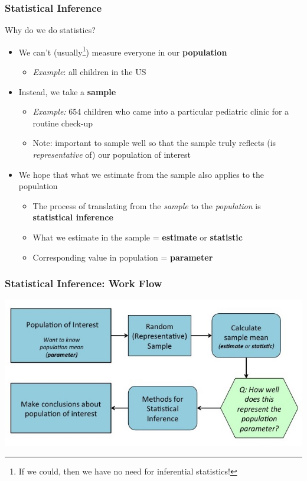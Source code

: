 \documentclass[12pt, 
hyperref={colorlinks=true, linkcolor=blue, urlcolor=cyan}]{beamer}
\begin{document}
\begin{frame}
\frametitle{Statistical Inference}
Why do we do statistics? \vspace{-0.3cm}
\begin{itemize}
\item We can't (usually\footnote[frame]{If we could, then we have no need for inferential statistics!}) measure everyone in our \textbf{population}
	\begin{itemize}
	\item \textit{Example}: all children in the US
	\end{itemize}
\pause
\item Instead, we take a \textbf{sample}
	\begin{itemize}
	\item \textit{Example:} 654 children who came into a particular pediatric clinic for a routine check-up
	\item Note: important to sample well so that the sample truly reflects (is \textit{representative} of) our population of interest
	\end{itemize}
\pause
\item We hope that what we estimate from the sample also applies to the population
	\begin{itemize}
	\item The process of translating from the \textit{sample} to the \textit{population} is \textbf{statistical inference}
	\item What we estimate in the sample = \textbf{estimate} or \textbf{statistic}
	\item Corresponding value in population = \textbf{parameter}
	\end{itemize}
\end{itemize}
\end{frame}

\begin{frame}
\frametitle{Statistical Inference: Work Flow} %

\includegraphics[width=\textwidth]{./inference}

\end{frame}
\end{document}
